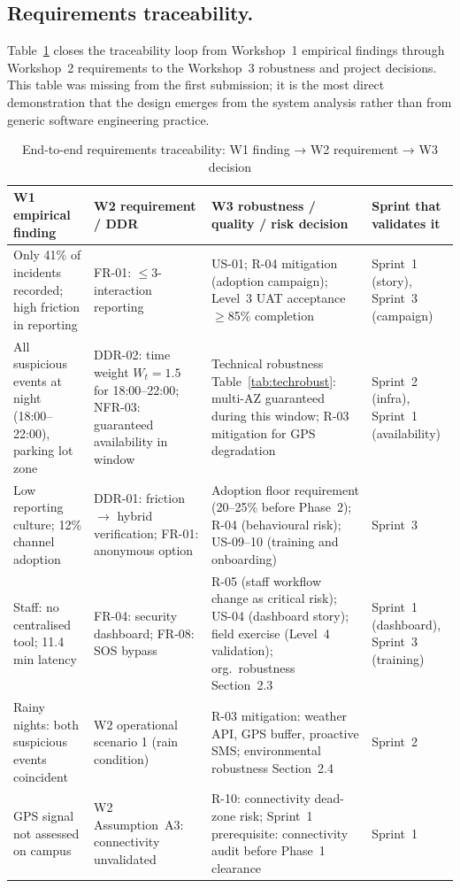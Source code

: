 \documentclass[12pt,a4paper]{article}
\begin{document}
\subsection{Requirements traceability.}
Table~\ref{tab:reqtrace} closes the traceability loop from Workshop~1
empirical findings through Workshop~2 requirements to the Workshop~3
robustness and project decisions. This table was missing from the
first submission; it is the most direct demonstration that the design
emerges from the system analysis rather than from generic software
engineering practice.

\begin{table}[h]
\caption{End-to-end requirements traceability: W1 finding → W2 requirement → W3 decision}
\label{tab:reqtrace}
\centering
\begin{tabularx}{\textwidth}{p{3.5cm}p{3.2cm}p{4.0cm}p{3.5cm}}
\toprule
\textbf{W1 empirical finding} & \textbf{W2 requirement / DDR} & \textbf{W3 robustness / quality / risk decision} & \textbf{Sprint that validates it} \\
\midrule
Only 41\% of incidents recorded; high friction in reporting & FR-01: $\leq$3-interaction reporting & US-01; R-04 mitigation (adoption campaign); Level~3 UAT acceptance $\geq$85\% completion & Sprint~1 (story), Sprint~3 (campaign) \\
All suspicious events at night (18:00--22:00), parking lot zone & DDR-02: time weight $W_t=1.5$ for 18:00--22:00; NFR-03: guaranteed availability in window & Technical robustness Table~\ref{tab:techrobust}: multi-AZ guaranteed during this window; R-03 mitigation for GPS degradation & Sprint~2 (infra), Sprint~1 (availability) \\
Low reporting culture; 12\% channel adoption & DDR-01: friction $\to$ hybrid verification; FR-01: anonymous option & Adoption floor requirement (20--25\% before Phase~2); R-04 (behavioural risk); US-09--10 (training and onboarding) & Sprint~3 \\
Staff: no centralised tool; 11.4 min latency & FR-04: security dashboard; FR-08: SOS bypass & R-05 (staff workflow change as critical risk); US-04 (dashboard story); field exercise (Level~4 validation); org.\ robustness Section~2.3 & Sprint~1 (dashboard), Sprint~3 (training) \\
Rainy nights: both suspicious events coincident & W2 operational scenario 1 (rain condition) & R-03 mitigation: weather API, GPS buffer, proactive SMS; environmental robustness Section~2.4 & Sprint~2 \\
GPS signal not assessed on campus & W2 Assumption~A3: connectivity unvalidated & R-10: connectivity dead-zone risk; Sprint~1 prerequisite: connectivity audit before Phase~1 clearance & Sprint~1 \\
\bottomrule
\end{tabularx}
\end{table}
\end{document}
